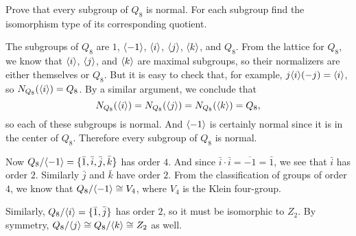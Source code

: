  Prove that every subgroup of $Q_8$ is normal. For each
subgroup find the isomorphism type of its corresponding quotient.
\begin{solution}
  The subgroups of $Q_8$ are $1$, $\langle{-1}\rangle$, $\langle{i}\rangle$, $\langle{j}\rangle$,
  $\langle{k}\rangle$, and $Q_8$. From the lattice for $Q_8$, we know that
  $\langle{i}\rangle$, $\langle{j}\rangle$, and $\langle{k}\rangle$ are maximal subgroups, so their
  normalizers are either themselves or $Q_8$. But it is easy to check
  that, for example, $j\langle{i}\rangle(-j) = \langle{i}\rangle$, so
  $N_{Q_8}(\langle{i}\rangle) = Q_8$. By a similar argument, we conclude that
  \begin{equation*}
    N_{Q_8}(\langle{i}\rangle) = N_{Q_8}(\langle{j}\rangle) = N_{Q_8}(\langle{k}\rangle) = Q_8,
  \end{equation*}
  so each of these subgroups is normal. And $\langle{-1}\rangle$ is certainly
  normal since it is in the center of $Q_8$. Therefore every subgroup
  of $Q_8$ is normal.

  Now $Q_8/\langle{-1}\rangle = \{\bar1, \bar i, \bar j, \bar k\}$ has order
  $4$. And since $\bar{i}\cdot\bar{i} = \overline{-1} = \bar1$, we see
  that $\bar{i}$ has order $2$. Similarly $\bar{j}$ and $\bar{k}$ have
  order $2$. From the classification of groups of order $4$, we know
  that $Q_8/\langle{-1}\rangle\cong V_4$, where $V_4$ is the Klein four-group.

  Similarly, $Q_8/\langle{i}\rangle = \{\bar1, \bar{j}\}$ has order $2$, so it
  must be isomorphic to $Z_2$. By symmetry,
  $Q_8/\langle{j}\rangle\cong Q_8/\langle{k}\rangle\cong Z_2$ as well.
\end{solution}
